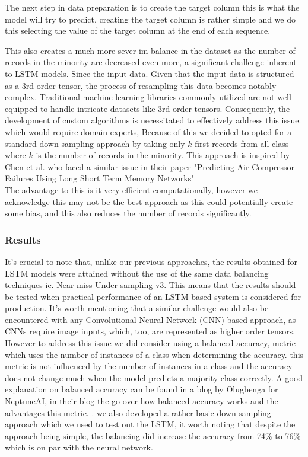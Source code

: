 \documentclass{article}
\begin{document}
The next step in data preparation is to create the target column this is what the model will try to predict. creating the target column is rather simple and we do this selecting the value of the target column at the end of each sequence.

This also creates a much more sever im-balance in the dataset as the number of records in the minority are decreased even more, a significant challenge inherent to LSTM models. Since the input data. Given that the input data is structured as a 3rd order tensor, the process of resampling this data becomes notably complex. Traditional machine learning libraries commonly utilized are not well-equipped to handle intricate datasets like 3rd order tensors. Consequently, the development of custom algorithms is necessitated to effectively address this issue. which would require domain experts, Because of this we decided to opted for a standard down sampling approach by taking only $k$ first records from all class where $k$ is the number of records in the minority. This approach is inspired by Chen et al. who faced a similar issue in their paper "Predicting Air Compressor Failures Using Long Short Term Memory Networks" \cite{Chen2019}\\


The advantage to this is it very efficient computationally, however we acknowledge this may not be the best approach as this could potentially create some bias, and this also reduces the number of records significantly.\\

\subsubsection{Results}

 It's crucial to note that, unlike our previous approaches, the results obtained for LSTM models were attained without the use of the same data balancing techniques ie. Near miss Under sampling v3. This means that the results should be tested when practical performance of an LSTM-based system is considered for production. It's worth mentioning that a similar challenge would also be encountered with any Convolutional Neural Network (CNN) based approach, as CNNs require image inputs, which, too, are represented as higher order tensors.\\

However to address this issue we did consider using a balanced accuracy, metric which uses the number of instances of a class when determining the accuracy. this metric is not influenced by the number of instances in a class and the accuracy does not change much when the model predicts a majority class correctly. A good explanation on balanced accuracy can be found in a blog by Olugbenga for NeptuneAI, in their blog the go over how balanced accuracy works and the advantages this metric. \cite{Olugbenga2023}. we also developed a rather basic down sampling approach which we used to test out the LSTM, it worth noting that despite the approach being simple, the balancing did increase the accuracy from 74\% to 76\% which is on par with the neural network.\\
\end{document}
